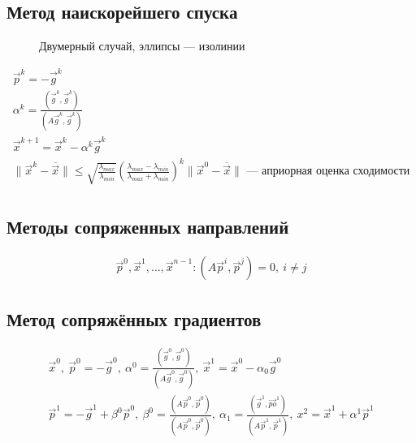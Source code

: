 \subsection{Метод наискорейшего спуска}
\begin{figure}[h]
  \centering
  
  \caption{Двумерный случай, эллипсы — изолинии}
\end{figure}
\begin{gather*}
  \vec{p}^k = -\vec{g}^k \\
  \alpha^k = \frac{(\vec{g}^k, \vec{g}^k)}{(A \vec{g}^k, \vec{g}^k)} \\
  \vec{x}^{k + 1} = \vec{x}^k - \alpha^k \vec{g}^k \\
  \|\vec{x}^k - \overline{\vec{x}}\| \leq
  \sqrt{\frac{\lambda_{max}}{\lambda_{min}}} (\frac{\lambda_{max} -
    \lambda_{min}}{\lambda_{max} + \lambda_{min}})^k \|\vec{x}^0
  -\overline{\vec{x}}\| \text{ --- априорная оценка сходимости}\\
\end{gather*}

\subsection{Методы сопряженных направлений}
\begin{gather*}
   \vec{p}^0, \vec{x}^1, \dotsc, \vec{x}^{n - 1} : (A\vec{p}^i, \vec{p}^j) = 0,\
   i \neq j
\end{gather*}

\subsection{Метод сопряжённых градиентов}
\begin{gather*}
  \vec{x}^0,\ \vec{p}^0 = -\vec{g}^0,\ \alpha^0 = \frac{(\vec{g}^0,
    \vec{g}^0)}{(A\vec{g}^0, \vec{g}^0)},\ \vec{x}^1 = \vec{x}^0 - \alpha_0
  \vec{g}^0 \\ 
  \vec{p}^1 = -\vec{g}^1 + \beta^0 \vec{p}^0,\ \beta^0 =
  \frac{(A\vec{p}^0, \vec{p}^0)}{(A\vec{p}^0, \vec{p}^0)},\ \alpha_1 =
  \frac{(\vec{g}^1, \vec{po}^1)}{(A\vec{p}^1, \vec{p}^1)},\ x^2 = \vec{x}^1 + \alpha^1 \vec{p}^1
\end{gather*}

